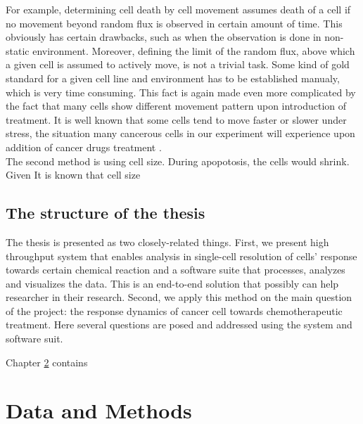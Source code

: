 \documentclass[pdftex,12pt,a4paper]{report}
\begin{document}
For example, determining cell death by cell movement assumes death of a cell if no movement beyond random flux is observed in certain amount of time. This obviously has certain drawbacks, such as when the observation is done in non-static environment. Moreover, defining the limit of the random flux, above which a given cell is assumed to actively move, is not a trivial task. Some kind of gold standard for a given cell line and environment has to be established manualy, which is very time consuming. This fact is again made even more complicated by the fact that many cells show different movement pattern upon introduction of treatment. It is well known that some cells tend to move faster or slower under stress, the situation many cancerous cells in our experiment will experience upon addition of cancer drugs treatment \cite{pienta1991effects, fenteany2003small, ruocco2012suppressing}.\\

The second method is using cell size. During apopotosis, the cells would shrink. Given It is known that cell size %



\section{The structure of the thesis}


The thesis is presented as two closely-related things. First, we present high throughput system that enables analysis in single-cell resolution of cells' response towards certain chemical reaction and a software suite that processes, analyzes and visualizes the data. This is an end-to-end solution that possibly can help researcher in their research. Second, we apply this method on the main question of the project: the response dynamics of cancer cell towards chemotherapeutic treatment. Here several questions are posed and addressed using the system and software suit.



Chapter \ref{chapter:data_and_method} contains %

\chapter{Data and Methods}

\label{chapter:data_and_method}
\end{document}
